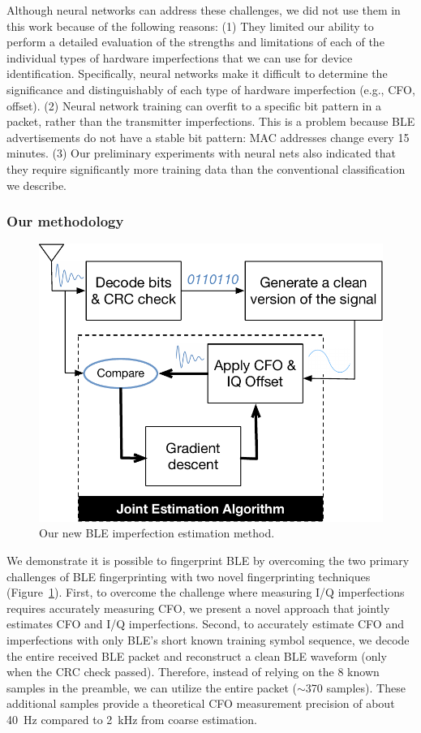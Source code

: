 Although neural networks can address these challenges, we did not use them in
this work because of the following reasons: (1) They limited our ability to
perform a detailed evaluation of the strengths and limitations of each of the
individual types of hardware imperfections that we can use for device
identification. Specifically, neural networks make it difficult to determine
the significance and distinguishably of each type of hardware imperfection
(e.g., CFO, \iq offset). (2) Neural network training can overfit to a specific
bit pattern in a packet, rather than the transmitter imperfections. This is a problem because
BLE advertisements do not have a stable bit pattern: MAC addresses change every
15 minutes.  (3) Our preliminary experiments with neural nets also indicated
that they require significantly more training data than the conventional
classification we describe.

\subsubsection*{Our methodology}

\begin{figure}
    \centering
    \includegraphics[width = 0.75\linewidth]{plots/jointestimation.pdf} 
    \caption{Our new BLE imperfection estimation method.}
    \label{fig:overview}
\end{figure}


We demonstrate it is possible to fingerprint BLE by overcoming the two primary
challenges of BLE fingerprinting with two novel fingerprinting techniques
(Figure~\ref{fig:overview}).  First, to overcome the challenge where measuring
I/Q imperfections requires accurately measuring CFO, we present a novel
approach that jointly estimates CFO and I/Q imperfections.  Second, to
accurately estimate CFO and \iq imperfections with only BLE's short known
training symbol sequence, we 
decode the entire received BLE packet and reconstruct a
clean BLE waveform (only when the CRC check passed). Therefore, instead of
relying on the 8 known samples in the preamble, we can utilize the entire
packet ($\sim$370 samples). These additional samples provide a theoretical CFO
measurement precision of about 40~Hz compared to 2~kHz from coarse estimation.

